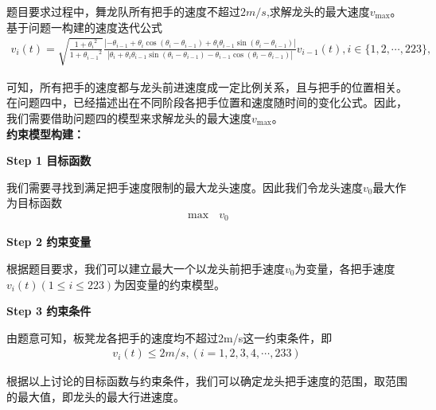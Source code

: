 \documentclass[../main.tex]{subfiles}
\begin{document}
\par 题目要求过程中，舞龙队所有把手的速度不超过$2m/s$,求解龙头的最大速度$v_{\max}$。
基于问题一构建的速度迭代公式
\begin{align}\label{1.........666}
    v_i(t) = \sqrt{\frac{1 + {\theta _i}^2}{1 + {\theta _{i - 1}}^2}}\frac{|-\theta _{i - 1}+\theta _i\cos(\theta _{i }-\theta _{i-1})+\theta _i\theta _{i - 1}\sin(\theta _{i }-\theta _{i-1})|}{|\theta _i+\theta _i\theta _{i - 1}\sin(\theta _i -\theta _{i-1})-\theta _{i - 1}\cos(\theta _i -\theta _{i-1})|}v_{i - 1}(t), i\in \{1, 2, \cdots, 223\},
    \end{align}
    \par 可知，所有把手的速度都与龙头前进速度成一定比例关系，且与把手的位置相关。在问题四中，已经描述出在不同阶段各把手位置和速度随时间的变化公式。因此，我们需要借助问题四的模型来求解龙头的最大速度$v_{\max}$。
\\\noindent\textbf{ 约束模型构建：}
\par \textbf{Step 1 目标函数}
\par 我们需要寻找到满足把手速度限制的最大龙头速度。因此我们令龙头速度$v_0$最大作为目标函数
\begin{align}\label{1...23.3.4}
    \max\text{\ }v_0
\end{align}
\par \textbf{Step 2 约束变量}
    \par 根据题目要求，我们可以建立最大一个以龙头前把手速度$v_0$为变量，各把手速度$v_i\left( t \right) \left( 1\le i\le 223 \right) $为因变量的约束模型。
 \par \textbf{Step 3 约束条件} 
\par 由题意可知，板凳龙各把手的速度均不超过2m/s这一约束条件，即 
\begin{align}\label{1.........462}
    v_i\left( t \right) \le 2m/s,\left(  \right. i=1,2,3,4,\cdots ,233\left.  \right) 
\end{align}
\par 根据以上讨论的目标函数与约束条件，我们可以确定龙头把手速度的范围，取范围的最大值，即龙头的最大行进速度。
 
\end{document}
